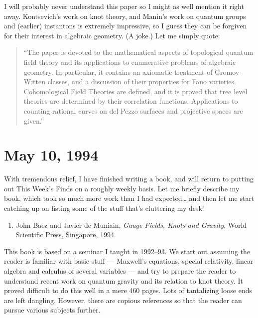 \documentclass[12pt]{article}
\def\tightlist{}
\begin{document}
I will probably never understand this paper so I might as well mention
it right away. Kontsevich's work on knot theory, and Manin's work on
quantum groups and (earlier) instantons is extremely impressive, so I
guess they can be forgiven for their interest in algebraic geometry. (A
joke.) Let me simply quote:

\begin{quote}
``The paper is devoted to the mathematical aspects of topological
quantum field theory and its applications to enumerative problems of
algebraic geometry. In particular, it contains an axiomatic treatment of
Gromov-Witten classes, and a discussion of their properties for Fano
varieties. Cohomological Field Theories are defined, and it is proved
that tree level theories are determined by their correlation functions.
Applications to counting rational curves on del Pezzo surfaces and
projective spaces are given.''
\end{quote}



\hypertarget{week33}{%
\section{May 10, 1994}\label{week33}}

With tremendous relief, I have finished writing a book, and will return
to putting out This Week's Finds on a roughly weekly basis. Let me
briefly describe my book, which took so much more work than I had
expected\ldots{} and then let me start catching up on listing some of
the stuff that's cluttering my desk!

\begin{enumerate}
\def\labelenumi{\arabic{enumi})}
\tightlist
\item
  John Baez and Javier de
  Muniain, \emph{Gauge Fields, Knots and Gravity}, World Scientific Press, Singapore, 
  1994.
\end{enumerate}

This book is based on a seminar I taught in 1992--93. We start out
assuming the reader is familiar with basic stuff --- Maxwell's
equations, special relativity, linear algebra and calculus of several
variables --- and try to prepare the reader to understand recent work on
quantum gravity and its relation to knot theory. It proved difficult to
do this well in a mere 460 pages. Lots of tantalizing loose ends are
left dangling. However, there are copious references so that the reader
can pursue various subjects further.
\end{document}
